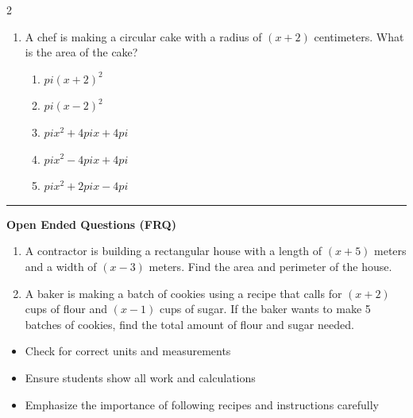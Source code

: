 \documentclass[10pt]{article}
\begin{document}
\begin{multicols}{2}
\begin{enumerate}[label=\textbf{Q\arabic*.}, leftmargin=*, itemsep=6pt, parsep=0pt]
  \item \small A chef is making a circular cake with a radius of $(x + 2)$ centimeters. What is the area of the cake?
  \begin{enumerate}[label=(\Alph*), leftmargin=0.6cm, nosep, itemsep=2pt]
    \item $pi (x + 2)^2$
    \item $pi (x - 2)^2$
    \item $pi x^2 + 4 pi x + 4 pi$
    \item $pi x^2 - 4 pi x + 4 pi$
    \item $pi x^2 + 2 pi x - 4 pi$
  \end{enumerate}

\end{enumerate}
\end{multicols}

\vspace{-0.2cm}
\hrule
\vspace{0.2cm}
\textbf{\small Open Ended Questions (FRQ)}
\begin{enumerate}[label=\textbf{Q\arabic*.}, start=9, itemsep=5pt, topsep=0pt]

  \item \small A contractor is building a rectangular house with a length of $(x + 5)$ meters and a width of $(x - 3)$ meters. Find the area and perimeter of the house. \vspace{2cm}

  \item \small A baker is making a batch of cookies using a recipe that calls for $(x + 2)$ cups of flour and $(x - 1)$ cups of sugar. If the baker wants to make 5 batches of cookies, find the total amount of flour and sugar needed. \vspace{2cm}

\end{enumerate}

\vfill

\begin{tcolorbox}[colback=blue!5, colframe=mainblue!50, title=\small \textbf{Chef's Tips}, fonttitle=\bfseries, bottom=1mm]
\begin{itemize}[noitemsep, topsep=2pt, leftmargin=0.5cm]
  \item \scriptsize Check for correct units and measurements\item \scriptsize Ensure students show all work and calculations\item \scriptsize Emphasize the importance of following recipes and instructions carefully
\end{itemize}
\end{tcolorbox}
\end{document}
